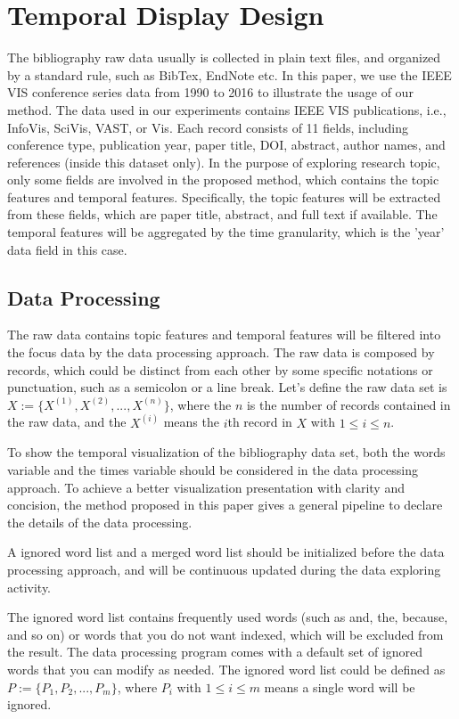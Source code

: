 \documentclass[10pt, conference, compsocconf]{IEEEtran}
\begin{document}
\section{Temporal Display Design}

The bibliography raw data usually is collected in plain text files, and organized by a standard rule, such as BibTex, EndNote etc. In this paper, we use the IEEE VIS conference series data\cite{Isenberg:2016ika} from 1990 to 2016 to illustrate the usage of our method. The data used in our experiments contains IEEE VIS publications, i.e., InfoVis, SciVis, VAST, or Vis. Each record consists of 11 fields, including conference type, publication year, paper title, DOI, abstract, author names, and references (inside this dataset only). In the purpose of exploring research topic, only some fields are involved in the proposed method, which contains the topic features and temporal features. Specifically, the topic features will be extracted from these fields, which are paper title, abstract, and full text if available. The temporal features will be aggregated by the time granularity, which is the 'year' data field in this case. 

\subsection{Data Processing}

The raw data contains topic features and temporal features will be filtered into the focus data by the data processing approach. The raw data is composed by records, which could be distinct from each other by some specific notations or punctuation, such as a semicolon or a line break. Let's define the raw data set is $X := \{X^{(1)},X^{(2)},...,X^{(n)}\}$, where the $n$ is the number of records contained in the raw data, and the $X^{(i)}$ means the $i$th record in $X$ with $1 \leq i \leq n$. 

To show the temporal visualization of the bibliography data set, both the words variable and the times variable should be considered in the data processing approach. To achieve a better visualization presentation with clarity and concision, the method proposed in this paper gives a general pipeline to declare the details of the data processing. 

A ignored word list and a merged word list should be initialized before the data processing approach, and will be continuous updated during the data exploring activity. 

The ignored word list contains frequently used words (such as and, the, because, and so on) or words that you do not want indexed, which will be excluded from the result. The data processing program comes with a default set of ignored words that you can modify as needed. The ignored word list could be defined as $ P := \{P_1,P_2,...,P_m\} $, where $P_i$ with $1 \leq i \leq m$ means a single word will be ignored. 
\end{document}
